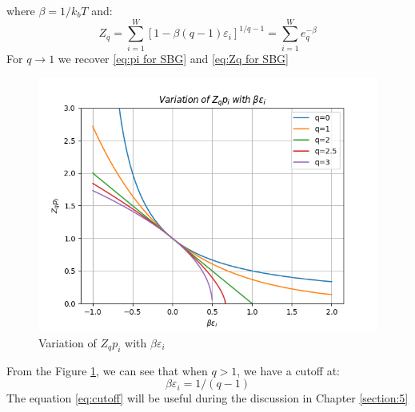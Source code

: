 \documentclass[11pt]{article}
\numberwithin{equation}{section}
\begin{document}
where $\beta=1/k_b T$ and:
\begin{equation}
	Z_q=\sum_{i=1}^{W} [1-\beta(q-1)\varepsilon_i]^{1/q-1}=\sum_{i=1}^{W} e_q^{-\beta	} \label{eq:Zq for S_q}
\end{equation}
For $q\to 1$ we recover \ref{eq:pi for SBG} and \ref{eq:Zq for SBG}
\begin{figure}[H]
\centering
  \includegraphics[width=0.9\linewidth]{"./Figures/p_i graph with z_q.png"}
  \caption{Variation of $Z_{q}p_{i}$ with $\beta\varepsilon_{i}$}
  \label{fig:p_i with z_q}
\end{figure}
From the Figure \ref{fig:p_i with z_q}, we can see that when $q>1$, we have a cutoff at:
\begin{equation}
	\beta\varepsilon_i=1/(q-1) \label{eq:cutoff}
\end{equation}
The equation \ref{eq:cutoff} will be useful during the discussion in Chapter \ref{section:5}
\end{document}
